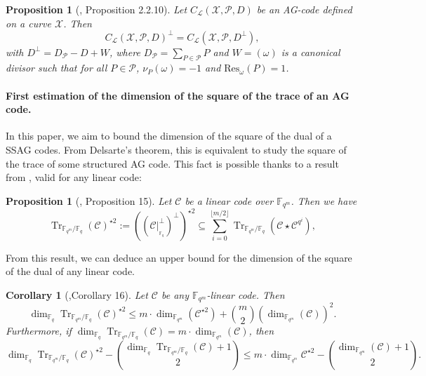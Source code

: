 \documentclass[a4paper]{article}
\newtheorem{proposition}[thm]{Proposition}
\newtheorem{coro}[thm]{Corollary}
\theoremstyle{definition}
\theoremstyle{remark}
\newcommand{\calP}{\mathcal{P}}
\newcommand{\calL}{\mathcal{L}}
\newcommand{\calC}{\mathcal{C}}
\newcommand{\calX}{\mathcal{X}}
\newcommand{\fqm}{\mathbb{F}_{q^m}}
\newcommand{\fq}{\mathbb{F}_{q}}
\newcommand{\Tr}[1]{\operatorname{Tr}_{\mathbb{F}_{q^m}/\fq}\left(#1\right)}
\begin{document}
\begin{proposition} [\cite{Sti09}, Proposition 2.2.10] \label{prop:dual_AG_codes}
Let $C_{\calL}(\calX,\calP,D)$ be an AG-code defined on a curve $\calX$. Then 
\[C_{\calL}(\calX,\calP,D)^{\perp} = C_{\calL}(\calX,\calP,D^{\perp}),\]
with $D^{\perp} = D_{\calP}-D+W$, where $D_{\calP} = \sum\limits_{P \in \calP} P$ and $W=(\omega)$ is a canonical divisor such that for all $P \in \calP$, $\nu_P(\omega)=-1$ and $\mathrm{Res}_{\omega}(P)=1$. 
\end{proposition}


\paragraph{First estimation of the dimension of the square of the trace of an AG code.}

In this paper, we aim to bound the dimension of the square of the dual of a SSAG codes. From Delsarte's theorem, this is equivalent to study the square of the trace of some structured AG code. 
This fact is possible thanks to a result from \cite{MT21}, valid for any linear code:

\begin{proposition}[\cite{MT21}, Proposition 15] \label{prop:Tr_BoundSchurSquare}
	Let $\calC$ be a linear code over $\fqm$. Then we have 
	\begin{equation} \label{eq:key_equation} \Tr{\calC}^{\star2} := ((\calC|^{\perp}_{_{{\mathbb{F}_q}}})^{\perp})^{\star2} \subseteq \sum\limits_{i=0}^{\lfloor{m/2} \rfloor} \Tr{\calC\star \calC^{q^i}},
	\end{equation}
\end{proposition}

From this result, we can deduce an upper bound for the dimension of the square of the dual of any linear code.

\begin{coro} [\cite{MT21},Corollary 16]\label{coro:first_bound_square_of_trace}
	Let $\calC$ be any $\fqm$-linear code. Then 
	\begin{equation} \label{eq:mumford_bound}
		\dim_{\fq}\Tr{\calC}^{\star2} \leq m \cdot \dim_{\fqm}(\calC^{\star 2}) + \binom{m}{2} (\dim_{\fqm}(\calC))^2.
	\end{equation}
	Furthermore, if $\dim_{\fq} \Tr{\calC} = m \cdot \dim_{\fqm}(\calC)$, then 
	\[\dim_{\fq} \Tr{\calC}^{\star2} - \binom{\dim_{\fq} \Tr{\calC}+1}{2} \leq m \cdot \dim_{\fqm} \calC^{\star 2} - \binom{\dim_{\fqm} (\calC)+1}{2}.\]
\end{coro}
\end{document}
